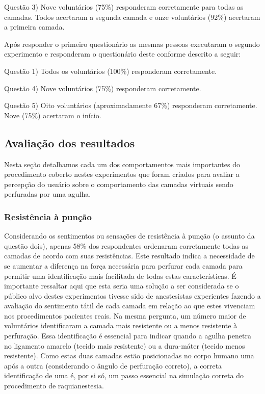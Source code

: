 Questão 3) Nove voluntários (75\%) responderam corretamente para todas as camadas. Todos acertaram a segunda camada e onze voluntários (92\%) acertaram a primeira camada. 

Após responder o primeiro questionário as mesmas pessoas executaram o segundo experimento e responderam o questionário deste conforme descrito a seguir:

Questão 1) Todos os voluntários (100\%) responderam corretamente.

Questão 4) Nove voluntários (75\%) responderam corretamente.

Questão 5) Oito voluntários (aproximadamente 67\%) responderam corretamente. Nove (75\%) acertaram o início.

\subsection{Avaliação dos resultados}
\label{sec:avaliacao}

Nesta seção detalhamos cada um dos comportamentos mais importantes do procedimento coberto nestes experimentos que foram criados para avaliar a percepção do usuário sobre o comportamento das
camadas virtuais sendo perfuradas por uma agulha.

\subsubsection{Resistência à punção}

Considerando os sentimentos ou sensações de resistência à punção (o assunto da questão dois), apenas 58\% dos respondentes ordenaram corretamente todas as camadas de acordo com suas resistências. Este resultado indica a necessidade de se aumentar a diferença na força necessária para perfurar cada camada para permitir uma identificação mais facilitada de todas estas características. É importante ressaltar aqui que esta seria uma solução a ser considerada se o público alvo destes experimentos tivesse sido de anestesistas experientes fazendo a avaliação do sentimento tátil de cada camada em relação ao que estes vivenciam nos procedimentos pacientes reais. Na mesma pergunta, um número maior de voluntários identificaram a camada mais resistente ou a menos resistente à perfuração. Essa identificação é essencial para indicar quando a agulha penetra no ligamento amarelo (tecido mais resistente) ou a dura-máter (tecido menos resistente). Como estas duas camadas estão posicionadas no corpo humano uma após a outra (considerando o ângulo de perfuração correto), a correta identificação de uma é, por si só, um passo essencial na simulação correta do procedimento de raquianestesia.

